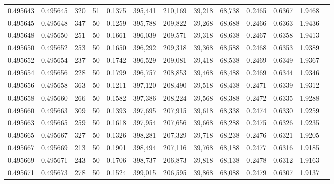 \begin{tabular}{rrrrrrrrrrrrr}
0.495643 & 0.495645 &   320 &  51 &                                     0.1375 & 395,441 & 210,169 &  39,218 &  68,738 & 0.2465 & 0.6367 & 1.9468 \\
0.495645 & 0.495648 &   347 &  50 &                                     0.1259 & 395,788 & 209,822 &  39,268 &  68,688 & 0.2466 & 0.6363 & 1.9436 \\
0.495648 & 0.495650 &   251 &  50 &                                     0.1661 & 396,039 & 209,571 &  39,318 &  68,638 & 0.2467 & 0.6358 & 1.9413 \\
0.495650 & 0.495652 &   253 &  50 &                                     0.1650 & 396,292 & 209,318 &  39,368 &  68,588 & 0.2468 & 0.6353 & 1.9389 \\
0.495652 & 0.495654 &   237 &  50 &                                     0.1742 & 396,529 & 209,081 &  39,418 &  68,538 & 0.2469 & 0.6349 & 1.9367 \\
0.495654 & 0.495656 &   228 &  50 &                                     0.1799 & 396,757 & 208,853 &  39,468 &  68,488 & 0.2469 & 0.6344 & 1.9346 \\
0.495656 & 0.495658 &   363 &  50 &                                     0.1211 & 397,120 & 208,490 &  39,518 &  68,438 & 0.2471 & 0.6339 & 1.9312 \\
0.495658 & 0.495660 &   266 &  50 &                                     0.1582 & 397,386 & 208,224 &  39,568 &  68,388 & 0.2472 & 0.6335 & 1.9288 \\
0.495660 & 0.495663 &   309 &  50 &                                     0.1393 & 397,695 & 207,915 &  39,618 &  68,338 & 0.2474 & 0.6330 & 1.9259 \\
0.495663 & 0.495665 &   259 &  50 &                                     0.1618 & 397,954 & 207,656 &  39,668 &  68,288 & 0.2475 & 0.6326 & 1.9235 \\
0.495665 & 0.495667 &   327 &  50 &                                     0.1326 & 398,281 & 207,329 &  39,718 &  68,238 & 0.2476 & 0.6321 & 1.9205 \\
0.495667 & 0.495669 &   213 &  50 &                                     0.1901 & 398,494 & 207,116 &  39,768 &  68,188 & 0.2477 & 0.6316 & 1.9185 \\
0.495669 & 0.495671 &   243 &  50 &                                     0.1706 & 398,737 & 206,873 &  39,818 &  68,138 & 0.2478 & 0.6312 & 1.9163 \\
0.495671 & 0.495673 &   278 &  50 &                                     0.1524 & 399,015 & 206,595 &  39,868 &  68,088 & 0.2479 & 0.6307 & 1.9137 \\

\end{tabular}
